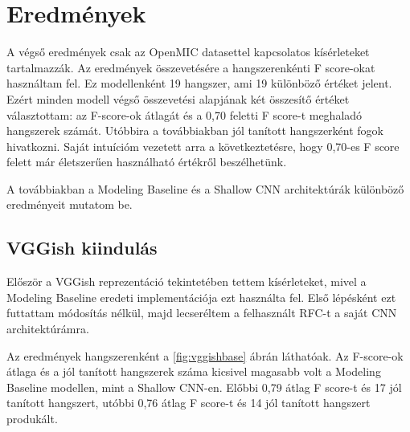 \section{Eredmények}

A végső eredmények csak az OpenMIC datasettel kapcsolatos kísérleteket tartalmazzák. Az eredmények összevetésére a hangszerenkénti F score-okat használtam fel. Ez modellenként 19 hangszer, ami 19 különböző értéket jelent. Ezért minden modell végső összevetési alapjának két összesítő értéket választottam: az F-score-ok átlagát és a 0,70 feletti F score-t meghaladó hangszerek számát. Utóbbira a továbbiakban jól tanított hangszerként fogok hivatkozni. Saját intuícióm vezetett arra a következtetésre, hogy 0,70-es F score felett már életszerűen használható értékről beszélhetünk.

A továbbiakban a Modeling Baseline és a Shallow CNN architektúrák különböző eredményeit mutatom be.

\subsection{VGGish kiindulás}

Először a VGGish reprezentáció tekintetében tettem kísérleteket, mivel a Modeling Baseline eredeti implementációja ezt használta fel. Első lépésként ezt futtattam módosítás nélkül, majd lecseréltem a felhasznált RFC-t a saját CNN architektúrámra.

Az eredmények hangszerenként a \ref{fig:vggishbase} ábrán láthatóak. Az F-score-ok átlaga és a jól tanított hangszerek száma kicsivel magasabb volt a Modeling Baseline modellen, mint a Shallow CNN-en. Előbbi 0,79 átlag F score-t és 17 jól tanított hangszert, utóbbi 0,76 átlag F score-t és 14 jól tanított hangszert produkált.

